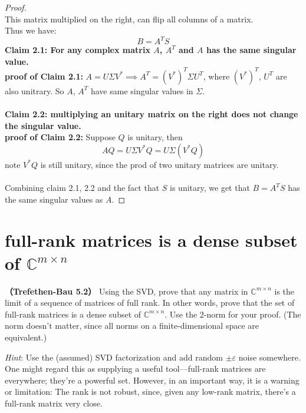 \documentclass[lang=cn,11pt]{elegantbook}
\begin{document}
\begin{solution}
\begin{proof}
\[\]
This matrix multiplied on the right, can flip all columns of a matrix.\\
Thus we have:
$$
B = A^T S
$$
\textbf{Claim 2.1: For any complex matrix $A$, $A^T$ and $A$ has the same singular value.}\\
\textbf{proof of Claim 2.1:} $A = U \Sigma V^* \implies A^T = (V^*)^T \Sigma U^T$, where $(V^*)^T $, $U^T$ are also unitrary. So $A$, $A^T$ have same singular values in $\Sigma$.\\\\
\textbf{Claim 2.2: multiplying an unitary matrix on the right does not change the singular value.}\\
\textbf{proof of Claim 2.2:} Suppose $Q$ is unitary, then
$$
AQ = U \Sigma V^* Q = U \Sigma (V^* Q)
$$
note $V^*Q$ is still unitary, since the prod of two unitary matrices are unitary.\\\\
Combining claim 2.1, 2.2 and the fact that $S$ is unitary, we get that $B = A^TS$ has the same singular values as $A$.
\end{proof}
\end{solution}

\section{full-rank matrices is a dense subset of $\mathbb{C}^{m \times n}$}
\textbf{（Trefethen-Bau 5.2）} Using the SVD, prove that any matrix in $\mathbb{C}^{m \times n}$ is the limit of a sequence of matrices of full rank. In other words, prove that the set of full-rank matrices is a dense subset of $\mathbb{C}^{m \times n}$. Use the 2-norm for your proof. (The norm doesn't matter, since all norms on a finite-dimensional space are equivalent.)

\textit{Hint}: Use the (assumed) SVD factorization and add random $\pm \varepsilon$ noise somewhere. One might regard this as supplying a useful tool—full-rank matrices are everywhere; they’re a powerful set. However, in an important way, it is a warning or limitation: The rank is not robust, since, given any low-rank matrix, there’s a full-rank matrix very close.
   
\end{document}

